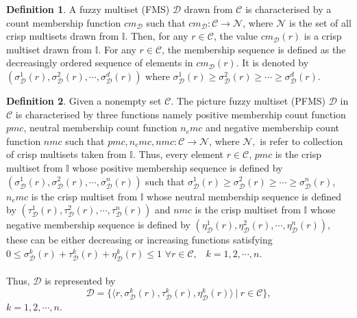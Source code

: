 \documentclass[12pt,letterpaper]{amsart}
\theoremstyle{plain}
\theoremstyle{definition}
\newtheorem{definition}{Definition}[section]
\numberwithin{equation}{section}
\begin{document}
\begin{definition}\cite{y}
A fuzzy multiset (FMS) $\mathcal{D}$ drawn from $\mathcal{C}$ is characterised by a count membership function $cm_{\mathcal{D}}$ such that $cm_{\mathcal{D}}: \mathcal{C} \rightarrow \mathcal{N}$, where $\mathcal{N}$ is the set of all crisp multisets drawn from $\mathbb{I}$. Then, for any $r \in \mathcal{C}$, the value $cm_{\mathcal{D}}(r)$ is a crisp multiset drawn from $\mathbb{I}.$ For any $r \in \mathcal{C}$, the membership sequence is defined as the decreasingly ordered sequence of elements in $cm_{\mathcal{D}}(r)$. It is denoted by $(\sigma^{1}_{\mathcal{\mathcal{D}}}(r), \sigma^{2}_{\mathcal{\mathcal{D}}}(r), \cdots, \sigma^{d}_{\mathcal{\mathcal{D}}}(r))$ where $\sigma^{1}_{\mathcal{D}}(r) \geq \sigma^{2}_{\mathcal{D}}(r) \geq \cdots \geq \sigma^{d}_{\mathcal{D}}(r).$
\end{definition}

\begin{definition} \cite{cfs}
Given a nonempty set $\mathcal{C}.$ The picture fuzzy multiset (PFMS) $\mathcal{D}$ in $\mathcal{C}$ is characterised by three functions namely positive membership count function $pmc$, neutral membership count function $n_{e}mc$ and negative membership count function $nmc$ such that $pmc, n_{e}mc, nmc: \mathcal{C} \rightarrow \mathcal{N}$,
where $\mathcal{N},$ is refer to collection of crisp multisets taken from $\mathbb{I}.$ Thus, every element $r \in \mathcal{C}$, $pmc$ is the crisp multiset from $\mathbb{I}$ whose positive membership sequence is defined by $(\sigma^{1}_{\mathcal{D}}(r), \sigma^{2}_{\mathcal{D}}(r), \cdots, \sigma^{n}_{\mathcal{D}}(r))$ such that $\sigma^{1}_{\mathcal{D}}(r) \geq \sigma^{2}_{\mathcal{D}}(r) \geq \cdots \geq \sigma^{n}_{\mathcal{D}}(r)$, $n_{e}mc$ is the crisp multiset from $\mathbb{I}$ whose neutral membership sequence is defined by $(\tau^{1}_{\mathcal{D}}(r), \tau^{2}_{\mathcal{D}}(r), \cdots, \tau^{n}_{\mathcal{D}}(r))$ and $nmc$ is the crisp multiset from $\mathbb{I}$ whose negative membership sequence is defined by $(\eta^{1}_{\mathcal{D}}(r), \eta^{2}_{\mathcal{D}}(r), \cdots, \eta^{n}_{\mathcal{D}}(r))$, these can be either decreasing or increasing functions satisfying $0 \leq \sigma^{k}_{\mathcal{D}}(r) + \tau^{k}_{\mathcal{D}}(r) + \eta^{k}_{\mathcal{D}}(r) \leq 1$ $ \forall r \in \mathcal{C},$~ $k = 1, 2, \cdots, n.$\\ \ \\ Thus, $\mathcal{D}$ is represented by $$\mathcal{D} = \lbrace \langle r, \sigma^{k}_{\mathcal{D}}(r), \tau^{k}_{\mathcal{D}}(r), \eta^{k}_{\mathcal{D}}(r)   \rangle~ |~ r \in \mathcal{C}  \rbrace,$$ $k = 1, 2, \cdots, n.$
\end{definition}
\end{document}
